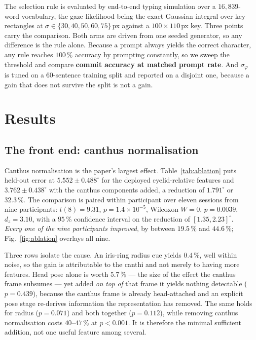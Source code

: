 \documentclass[conference]{IEEEtran}
\begin{document}
The selection rule is evaluated by end-to-end typing simulation over a
$16{,}839$-word vocabulary, the gaze likelihood being the exact Gaussian
integral over key rectangles at $\sigma \in \{30,40,50,60,75\}$\,px against a
$100\times110$\,px key. Three points carry the comparison. Both arms are driven
from one seeded generator, so any difference is the rule alone. Because a prompt
always yields the correct character, any rule reaches $100\,\%$ accuracy by
prompting constantly, so we sweep the threshold and compare \textbf{commit
accuracy at matched prompt rate}. And $\sigma_\varphi$ is tuned on a
$60$-sentence training split and reported on a disjoint one, because a gain that
does not survive the split is not a gain.

\section{Results}
\label{sec:results}

\subsection{The front end: canthus normalisation}

Canthus normalisation is the paper's largest effect.
Table~\ref{tab:ablation} puts held-out error at $5.552 \pm 0.488^\circ$ for the
deployed eyelid-relative features and $3.762 \pm 0.438^\circ$ with the canthus
components added, a reduction of $1.791^\circ$ or $32.3\,\%$. The comparison is
paired within participant over eleven sessions from nine participants:
$t(8) = 9.31$, $p = 1.4\times10^{-5}$, Wilcoxon $W = 0$, $p = 0.0039$,
$d_z = 3.10$, with a $95\,\%$ confidence interval on the reduction of
$[1.35, 2.23]^\circ$. \emph{Every one of the nine participants improved}, by
between $19.5\,\%$ and $44.6\,\%$; Fig.~\ref{fig:ablation} overlays all nine.

Three rows isolate the cause. An iris-ring radius cue yields $0.4\,\%$, well
within noise, so the gain is attributable to the canthi and not merely to having
more features. Head pose alone is worth $5.7\,\%$ --- the size of the effect the
canthus frame subsumes --- yet added \emph{on top of} that frame it yields
nothing detectable ($p = 0.439$), because the canthus frame is already
head-attached and an explicit pose stage re-derives information the
representation has removed. The same holds for radius ($p = 0.071$) and both
together ($p = 0.112$), while removing canthus normalisation costs
$40$--$47\,\%$ at $p < 0.001$. It is therefore the minimal sufficient addition,
not one useful feature among several.
\end{document}
